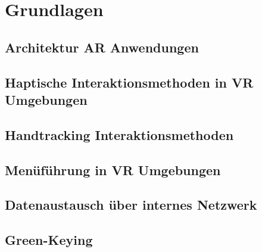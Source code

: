 \section{Grundlagen}
\subsection{Architektur AR Anwendungen}
\subsection{Haptische Interaktionsmethoden in VR Umgebungen}
\subsection{Handtracking Interaktionsmethoden}
\subsection{Menüführung in VR Umgebungen}
\subsection{Datenaustausch über internes Netzwerk}

\subsection{Green-Keying}\label{sec:Green-Keying}
